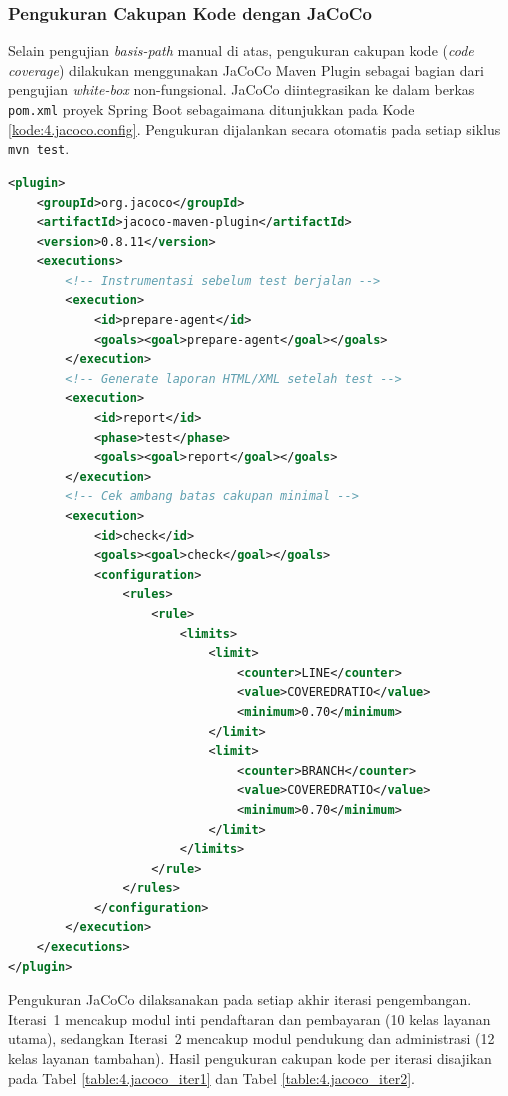 \subsubsection{Pengukuran Cakupan Kode dengan JaCoCo} \label{IV.HasilJaCoCo}
Selain pengujian \textit{basis-path} manual di atas, pengukuran cakupan kode (\textit{code coverage}) dilakukan menggunakan JaCoCo Maven Plugin sebagai bagian dari pengujian \textit{white-box} non-fungsional. JaCoCo diintegrasikan ke dalam berkas \texttt{pom.xml} proyek Spring Boot sebagaimana ditunjukkan pada Kode \ref{kode:4.jacoco.config}. Pengukuran dijalankan secara otomatis pada setiap siklus \texttt{mvn test}.\par

\begin{lstlisting}[language=XML, caption={Konfigurasi JaCoCo Maven Plugin pada pom.xml}, label={kode:4.jacoco.config}]
<plugin>
    <groupId>org.jacoco</groupId>
    <artifactId>jacoco-maven-plugin</artifactId>
    <version>0.8.11</version>
    <executions>
        <!-- Instrumentasi sebelum test berjalan -->
        <execution>
            <id>prepare-agent</id>
            <goals><goal>prepare-agent</goal></goals>
        </execution>
        <!-- Generate laporan HTML/XML setelah test -->
        <execution>
            <id>report</id>
            <phase>test</phase>
            <goals><goal>report</goal></goals>
        </execution>
        <!-- Cek ambang batas cakupan minimal -->
        <execution>
            <id>check</id>
            <goals><goal>check</goal></goals>
            <configuration>
                <rules>
                    <rule>
                        <limits>
                            <limit>
                                <counter>LINE</counter>
                                <value>COVEREDRATIO</value>
                                <minimum>0.70</minimum>
                            </limit>
                            <limit>
                                <counter>BRANCH</counter>
                                <value>COVEREDRATIO</value>
                                <minimum>0.70</minimum>
                            </limit>
                        </limits>
                    </rule>
                </rules>
            </configuration>
        </execution>
    </executions>
</plugin>
\end{lstlisting}

Pengukuran JaCoCo dilaksanakan pada setiap akhir iterasi pengembangan. Iterasi~1 mencakup modul inti pendaftaran dan pembayaran (10 kelas layanan utama), sedangkan Iterasi~2 mencakup modul pendukung dan administrasi (12 kelas layanan tambahan). Hasil pengukuran cakupan kode per iterasi disajikan pada Tabel \ref{table:4.jacoco_iter1} dan Tabel \ref{table:4.jacoco_iter2}.\par

